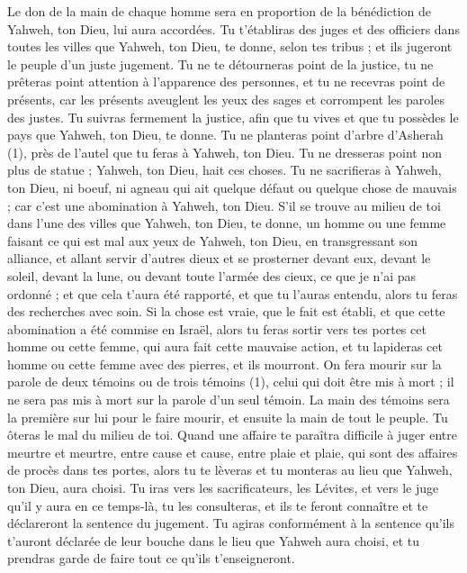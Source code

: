 \begin{multicols}{2}
Le don de la main de chaque homme sera en proportion de la bénédiction de Yahweh, ton Dieu, lui aura accordées.
Tu t'établiras des juges et des officiers dans toutes les villes que Yahweh, ton Dieu, te donne, selon tes tribus ; et ils jugeront le peuple d’un juste jugement.
Tu ne te détourneras point de la justice, tu ne prêteras point attention à l'apparence des personnes, et tu ne recevras point de présents, car les présents aveuglent les yeux des sages et corrompent les paroles des justes.
Tu suivras fermement la justice, afin que tu vives et que tu possèdes le pays que Yahweh, ton Dieu, te donne.
Tu ne planteras point d’arbre d’Asherah (1), près de l'autel que tu feras à Yahweh, ton Dieu.
Tu ne dresseras point non plus de statue ; Yahweh, ton Dieu, hait ces choses.
\VerseOne{}Tu ne sacrifieras à Yahweh, ton Dieu, ni boeuf, ni agneau qui ait quelque défaut ou quelque chose de mauvais ; car c'est une abomination à Yahweh, ton Dieu.
S’il se trouve au milieu de toi dans l’une des villes que Yahweh, ton Dieu, te donne, un homme ou une femme faisant ce qui est mal aux yeux de Yahweh, ton Dieu, en transgressant son alliance,
et allant servir d'autres dieux et se prosterner devant eux, devant le soleil, devant la lune, ou devant toute l'armée des cieux, ce que je n'ai pas ordonné ;
et que cela t'aura été rapporté, et que tu l’auras entendu, alors tu feras des recherches avec soin. Si la chose est vraie, que le fait est établi, et que cette abomination a été commise en Israël,
alors tu feras sortir vers tes portes cet homme ou cette femme, qui aura fait cette mauvaise action, et tu lapideras cet homme ou cette femme avec des pierres, et ils mourront.
On fera mourir sur la parole de deux témoins ou de trois témoins (1), celui qui doit être mis à mort ; il ne sera pas mis à mort sur la parole d'un seul témoin.
La main des témoins sera la première sur lui pour le faire mourir, et ensuite la main de tout le peuple. Tu ôteras le mal du milieu de toi.
Quand une affaire te paraîtra difficile à juger entre meurtre et meurtre, entre cause et cause, entre plaie et plaie, qui sont des affaires de procès dans tes portes, alors tu te lèveras et tu monteras au lieu que Yahweh, ton Dieu, aura choisi.
Tu iras vers les sacrificateurs, les Lévites, et vers le juge qu’il y aura en ce temps-là, tu les consulteras, et ils te feront connaître et te déclareront la sentence du jugement.
Tu agiras conformément à la sentence qu’ils t’auront déclarée de leur bouche dans le lieu que Yahweh aura choisi, et tu prendras garde de faire tout ce qu'ils t'enseigneront.

\end{multicols}
